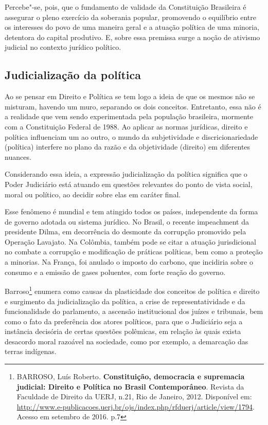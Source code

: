 {Percebe"-se, pois, que o fundamento de validade da Constituição
Brasileira é assegurar o pleno exercício da soberania popular,
promovendo o equilíbrio entre os interesses do povo de uma maneira geral
e a atuação política de uma minoria, detentora do capital produtivo. E,
sobre essa premissa surge a noção de ativismo judicial no contexto
jurídico político.

\subsection{Judicialização da política}

Ao se pensar em Direito e Política se tem logo a ideia de que os mesmos
não se misturam, havendo um muro, separando os dois conceitos.
Entretanto, essa não é a realidade que vem sendo experimentada pela
população brasileira, mormente com a Constituição Federal de 1988. Ao
aplicar as normas jurídicas, direito e política influenciam um ao outro,
o mundo da subjetividade e discricionariedade (política) interfere no
plano da razão e da objetividade (direito) em diferentes nuances.

Considerando essa ideia, a expressão judicialização da política
significa que o Poder Judiciário está atuando em questões relevantes do
ponto de vista social, moral ou político, ao decidir sobre elas em
caráter final.

Esse fenômeno é mundial e tem atingido todos os países, independente da
forma de governo adotada ou sistema jurídico. No Brasil, o recente
impeachment da presidente Dilma, em decorrência do desmonte da corrupção
promovido pela Operação Lavajato. Na Colômbia, também pode se citar a
atuação jurisdicional no combate a corrupção e modificação de práticas
políticas, bem como a proteção a minorias. Na França, foi anulado o
imposto do carbono, que incidiria sobre o consumo e a emissão de gases
poluentes, com forte reação do governo.

Barroso\footnote{BARROSO, Luís Roberto\emph{.} \textbf{Constituição,
  democracia e supremacia judicial: Direito e Política no Brasil
  Contemporâneo}. Revista da Faculdade de Direito da UERJ, n.21, Rio de
  Janeiro, 2012. Disponível em:
  \href{http://www.e-publicacoes.uerj.br/ojs/index.php/rfduerj/article/view/1794}{{http://www.e-publicacoes.uerj.br/ojs/index.php/rfduerj/article/view/1794}}.
  Acesso em setembro de 2016. p.7} enumera como causas da plasticidade
dos conceitos de política e direito e surgimento da judicialização da
política, a crise de representatividade e da funcionalidade do
parlamento, a ascensão institucional dos juízes e tribunais, bem como o
fato da preferência dos atores políticos, para que o Judiciário seja a
instância decisória de certas questões polêmicas, em relação às quais
exista desacordo moral razoável na sociedade, como por exemplo, a
demarcação das terras indígenas.

}
